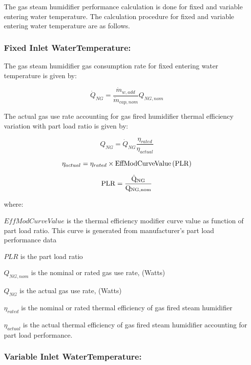 The gas steam humidifier performance calculation is done for fixed and variable entering water temperature. The calculation procedure for fixed and variable entering water temperature are as follows.

\subsubsection{Fixed Inlet WaterTemperature:}\label{fixed-inlet-watertemperature}

The gas steam humidifier gas consumption rate for fixed entering water temperature is given by:

\begin{equation}
\dot{Q}_{NG} = \frac{\dot{m}_{w,add}}{\dot{m}_{cap,nom}}Q_{NG,nom}
\end{equation}

The actual gas use rate accounting for gas fired humidifier thermal efficiency variation with part load ratio is given by:

\begin{equation}
Q_{NG} = \dot{Q}_{NG}\frac{\eta_{rated}}{\eta_{actual}}
\end{equation}

\begin{equation}
\eta_{actual} = \eta_{rated} \times \rm{EffModCurveValue}\left(PLR\right)
\end{equation}

\begin{equation}
\rm{PLR} = \frac{\dot{Q}_{NG}}{Q_{NG,nom}}
\end{equation}

where:

\(EffModCurveValue\) is the thermal efficiency modifier curve value as function of part load ratio. This curve is generated from manufacturer's part load performance data

\(PLR\) is the part load ratio

\(Q_{NG,nom}\) is the nominal or rated gas use rate, (Watts)

\(Q_{NG}\) is the actual gas use rate, (Watts)

\({\eta_{rated}}\) is the nominal or rated thermal efficiency of gas fired steam humidifier

\({\eta_{actual}}\) is the actual thermal efficiency of gas fired steam humidifier accounting for part load performance.

\subsubsection{Variable Inlet WaterTemperature:}\label{variable-inlet-watertemperature}

